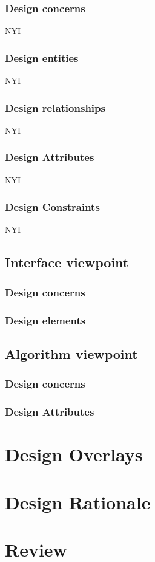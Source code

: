 \documentclass[12pt]{article}
\begin{document}
            \subsubsection{Design concerns}
            NYI
            \subsubsection{Design entities}
            NYI
            \subsubsection{Design relationships}
            NYI
            \subsubsection{Design Attributes}
            NYI
            \subsubsection{Design  Constraints}
            NYI
            
        \subsection{Interface viewpoint}%
            \subsubsection{Design concerns}
               
            \subsubsection{Design elements}
                
        \subsection{Algorithm viewpoint}%
            \subsubsection{Design concerns}
             \subsubsection{Design Attributes}

\section{Design Overlays}
\section{Design Rationale}
\section{Review}

\normalsize
\end{document}
